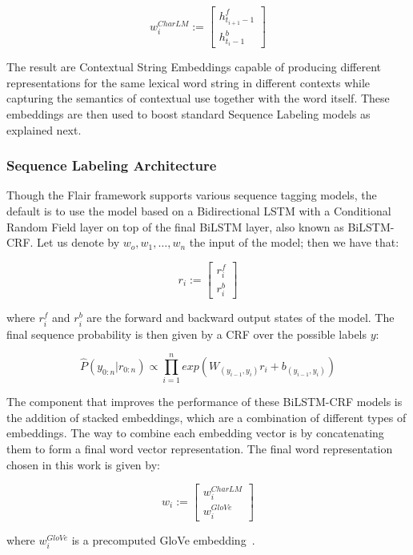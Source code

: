 \[
    w_i^{CharLM} := \begin{bmatrix} h_{t_{i+1}-1}^f \\ h_{t_{i}-1}^b \end{bmatrix}
\]

The result are Contextual String Embeddings capable of producing different representations for 
the same lexical word string in different contexts while capturing the semantics of contextual 
use together with the word itself. These embeddings are then used to boost standard Sequence 
Labeling models as explained next.

\subsubsection{Sequence Labeling Architecture}
\label{cap2:theoFrame/infExtr/sequenceLabeling/architecture}
Though the Flair framework supports various sequence tagging models, the default is to use the 
model based on a Bidirectional LSTM with a Conditional Random Field layer on top of the final 
BiLSTM layer, also known as BiLSTM-CRF\cite{seqlab:HuangXY15}. Let us denote by $w_o,w_1,\ldots,w_n$ 
the input of the model; then we have that:

\[
    r_i := \begin{bmatrix} r_i^f \\ r_i^b \end{bmatrix}
\]

where $r_i^f$ and $r_i^b$ are the forward and backward output states of the model. The final 
sequence probability is then given by a CRF over the possible labels $y$:

\[
    \widehat{P}(y_{0:n}|r_{0:n})\propto \prod_{i=1}^n exp(W_{(y_{i-1},y_i)} r_i +b_{(y_{i-1},y_i)})
\]

The component that improves the performance of these BiLSTM-CRF models is the addition of 
stacked embeddings, which are a combination of different types of embeddings. The way to combine 
each embedding vector is by concatenating them to form a final word vector representation. The 
final word representation chosen in this work is given by:

\begin{equation} \label{eq:flairWordRepr}
    w_i := \begin{bmatrix} w_i^{CharLM} \\ w_i^{GloVe} \end{bmatrix}
\end{equation}

\noindent where $w_i^{GloVe}$ is a precomputed GloVe embedding~\cite{seqlab:PenningtonSM14}. 

